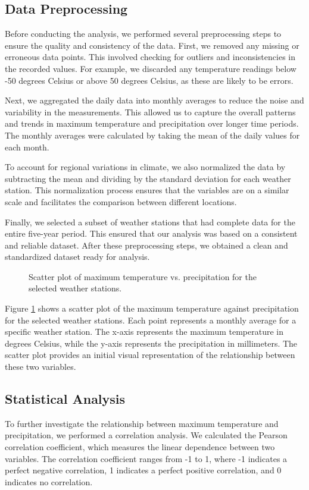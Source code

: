 \documentclass{article}
\begin{document}
\subsection{Data Preprocessing}
Before conducting the analysis, we performed several preprocessing steps to ensure the quality and consistency of the data. First, we removed any missing or erroneous data points. This involved checking for outliers and inconsistencies in the recorded values. For example, we discarded any temperature readings below -50 degrees Celsius or above 50 degrees Celsius, as these are likely to be errors.

Next, we aggregated the daily data into monthly averages to reduce the noise and variability in the measurements. This allowed us to capture the overall patterns and trends in maximum temperature and precipitation over longer time periods. The monthly averages were calculated by taking the mean of the daily values for each month.

To account for regional variations in climate, we also normalized the data by subtracting the mean and dividing by the standard deviation for each weather station. This normalization process ensures that the variables are on a similar scale and facilitates the comparison between different locations.

Finally, we selected a subset of weather stations that had complete data for the entire five-year period. This ensured that our analysis was based on a consistent and reliable dataset. After these preprocessing steps, we obtained a clean and standardized dataset ready for analysis.

\begin{figure}[h]
  \centering
  \caption{Scatter plot of maximum temperature vs. precipitation for the selected weather stations.}
  \label{fig:scatter_plot}
\end{figure}

Figure \ref{fig:scatter_plot} shows a scatter plot of the maximum temperature against precipitation for the selected weather stations. Each point represents a monthly average for a specific weather station. The x-axis represents the maximum temperature in degrees Celsius, while the y-axis represents the precipitation in millimeters. The scatter plot provides an initial visual representation of the relationship between these two variables.

\subsection{Statistical Analysis}
To further investigate the relationship between maximum temperature and precipitation, we performed a correlation analysis. We calculated the Pearson correlation coefficient, which measures the linear dependence between two variables. The correlation coefficient ranges from -1 to 1, where -1 indicates a perfect negative correlation, 1 indicates a perfect positive correlation, and 0 indicates no correlation.
\end{document}
